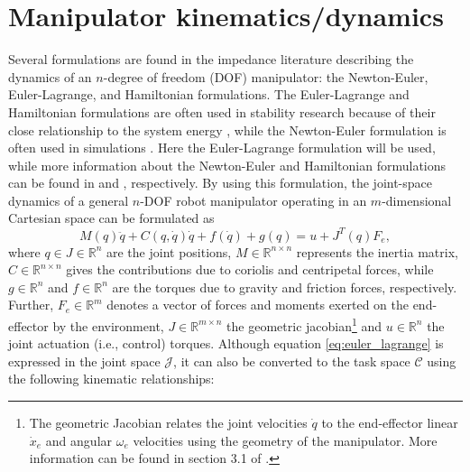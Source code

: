\section{Manipulator kinematics/dynamics}

Several formulations are found in the impedance literature describing the dynamics of an $n$-degree of freedom (DOF) manipulator: the Newton-Euler, Euler-Lagrange, and Hamiltonian formulations. The Euler-Lagrange and Hamiltonian formulations are often used in stability research because of their close relationship to the system energy \cite{haddadNonlinearDynamicalSystems2011}, while the Newton-Euler formulation is often used in simulations \cite{sicilianoRoboticsModellingPlanning2010}. Here the Euler-Lagrange formulation will be used, while more information about the Newton-Euler and Hamiltonian formulations can be found in \cite{sicilianoRoboticsModellingPlanning2010} and \cite{baoProcessControlPassive2007}, respectively. By using this formulation, the joint-space dynamics of a general $n$-DOF robot manipulator operating in an $m$-dimensional Cartesian space can be formulated as
\begin{equation} \label{eq:euler_lagrange}
  M \left( q \right)\ddot{ q }+ C \left( q ,\dot{ q }\right)\dot{ q }+ f \left(\dot{ q }\right)+ g \left( q \right)= u + J^T \left( q \right) F_e,
\end{equation}
where $q \in J \in\mathbb{R}^n$ are the joint positions, $M \in\mathbb{R}^{n \times n}$ represents the inertia matrix, $C \in\mathbb{R}^{ n \times n }$ gives the contributions due to coriolis and centripetal forces, while $g \in\mathbb{R}^n$ and $f \in\mathbb{R}^n$ are the torques due to gravity and friction forces, respectively. Further, $F_e \in\mathbb{R}^m$ denotes a vector of forces and moments exerted on the end-effector by the environment, $J \in\mathbb{R}^{ m \times n }$ the geometric jacobian\footnote{The geometric Jacobian relates the joint velocities $\dot{q}$ to the end-effector linear $\dot{x}_e$ and angular $\omega_e$ velocities using the geometry of the manipulator. More information can be found in section 3.1 of \cite{sicilianoRoboticsModellingPlanning2010}.} and $u \in\mathbb{R}^n$ the joint actuation (i.e., control) torques. Although equation \eqref{eq:euler_lagrange} is expressed in the joint space $\mathcal{J}$, it can also be converted to the task space $\mathcal{C}$ using the following kinematic relationships:
